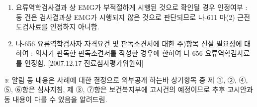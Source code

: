 \begin{enumerate}[①]
\item 요류역학검사결과 상 EMG가 부적절하게 시행된 것으로 확인될 경우 인정여부
: 동 건은 검사결과상 EMG가 시행되지 않은 것으로 판단되므로 나-611 마(2) 근전도검사료를 인정하지 아니함.
  
\item 나-656 요류역학검사자 자격요건 및 판독소견서에 대한 주)항목 신설 필요성에 대하여
: 의사가 판독한 판독소견서를 작성한 경우에 한하여 나-656 요류역학검사료를 인정함.
[2007.12.17 진료심사평가위원회]
\end{enumerate}

\begin{mdframed}[linecolor=blue,middlelinewidth=2]  
※ 알림
동 내용은 사례에 대한 결정으로 외부공개 하는바 상기항목 중 제 ①, ②, ④, ⑤, ⑥항은 심사지침, 제 ③, ⑦항은 보건복지부에 고시건의 예정이므로 추후 고시안과 동 내용이 다를 수 있음을 알려드림.
\end{mdframed}

